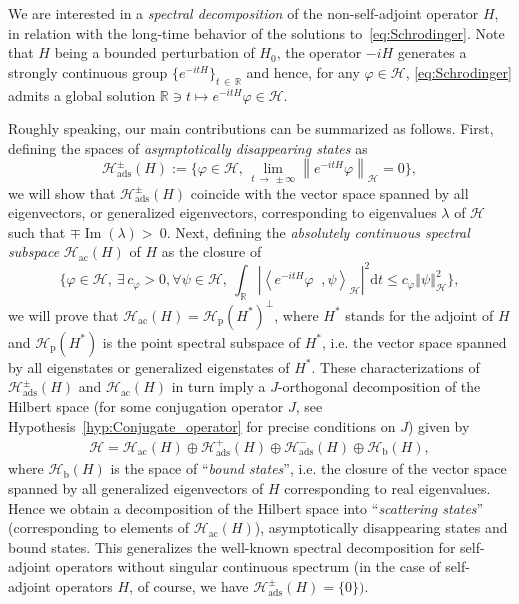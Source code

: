 \documentclass[10pt]{amsart}
\theoremstyle{definition}\newtheorem{defi}[theo]{Definition}\newtheorem{rema}[theo]{Remark}\newtheorem{exam}[theo]{Example}\newtheorem{exem}[theo]{Example}\newtheorem{nota}[theo]{Notation}
\newcommand{\Hi}{\mathcal{H}}
\newcommand{\R}{\mathbb{R}}
\newcommand{\rmp}{\mathrm{p}}
\newcommand{\acr}{\mathrm{ac}}
\newcommand{\ads}{\mathrm{ads}}
\newcommand{\rmd}{\mathrm{d}}
\newcommand{\rmb}{\mathrm{b}}
\newcommand{\norme}[1]{\left\Vert #1\right\Vert}
\newcommand{\scal}[2]{\left\langle{#1} \middle., {#2}\right\rangle}
\newcommand{\abso}[1]{\left|{#1}\right|}
\DeclareMathOperator{\im}{Im}
\let\oldexists\exists
\renewcommand*{\exists}{\mathrel{\oldexists}}
\let\oldforall\forall
\renewcommand*{\forall}{\mathrel{\oldforall}}
\begin{document}
We are interested in a \emph{spectral decomposition} of the non-self-adjoint operator $H$, in relation with the long-time behavior of the solutions to~\eqref{eq:Schrodinger}. Note that $H$ being a bounded perturbation of $H_0$, the operator $-iH$ generates a strongly continuous group $\{e^{-itH}\}_{t\,\in\,\R}$ and hence, for any $\varphi\in\Hi$, \eqref{eq:Schrodinger} admits a global solution $\R\ni t\mapsto e^{-itH}\varphi\in\Hi$.

Roughly speaking, our main contributions can be summarized as follows. First, defining the spaces of \emph{asymptotically disappearing states} as
\begin{equation*}
\Hi_{\ads}^\pm(H):=\Big\{\varphi\in\Hi, \, \lim_{t\,\to\,\pm\infty}\left\|e^{-itH}\varphi\right\|_\Hi=0\Big\},
\end{equation*}
we will show that $\Hi_{\ads}^\pm(H)$ coincide with the vector space spanned by all eigenvectors, or generalized eigenvectors, corresponding to eigenvalues $\lambda$ of $\Hi$ such that $\mp\im(\lambda)>~0$. Next, defining the \emph{absolutely continuous spectral subspace} $\Hi_{\acr}(H)$ of $H$ as the closure of
\begin{equation*}
\Big\lbrace \varphi\in\Hi,~\exists\, c_\varphi>0,\forall \psi\in\Hi,~\int_\R\abso{\scal{e^{-itH}\varphi}{\psi}_\Hi}^2\rmd t\leq c_\varphi\norme{\psi}^2_\Hi \Big\rbrace,
\end{equation*}
we will prove that $\Hi_{\acr}(H)=\Hi_{\rmp}(H^*)^\perp$, where $H^*$ stands for the adjoint of $H$ and $\Hi_{\rmp}(H^*)$ is the point spectral subspace of $H^*$, i.e. the vector space spanned by all eigenstates or generalized eigenstates of $H^*$. These characterizations of $\Hi_{\ads}^\pm(H)$ and $\Hi_{\acr}(H)$ in turn imply a $J$-orthogonal decomposition of the Hilbert space (for some conjugation operator $J$, see Hypothesis~\ref{hyp:Conjugate_operator} for precise conditions on $J$) given by
\begin{align}\label{eq:spec-decom-intro}
\Hi = \Hi_{\acr}(H) \oplus \Hi_{\ads}^+(H)\oplus\Hi_{\ads}^-(H)\oplus\Hi_{\rmb}(H),
\end{align}
where $\Hi_{\rmb}(H)$ is the space of ``\emph{bound states}'', i.e. the closure of the vector space spanned by all generalized eigenvectors of $H$ corresponding to real eigenvalues. Hence we obtain a decomposition of the Hilbert space into ``\emph{scattering states}'' (corresponding to elements of $\Hi_{\acr}(H)$), asymptotically disappearing states and bound states. This generalizes the well-known spectral decomposition for self-adjoint operators without singular continuous spectrum (in the case of self-adjoint operators $H$, of course, we have $\Hi_{\ads}^\pm(H)=\{0\})$.
\end{document}
